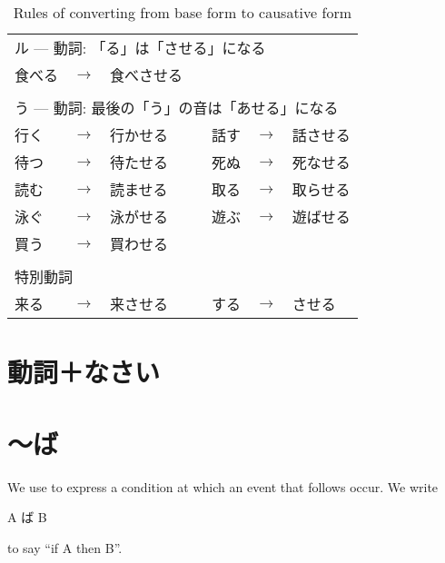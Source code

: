 \documentclass[notoc,notitlepage]{tufte-book}
\begin{document}
\begin{table}[ht]
  \centering
  \caption{Rules of converting from base form to causative form}
  \label{table:rules_of_converting_from_base_form_to_causative_form}
  \begin{tabular}{l c l c l c l}
  \multicolumn{7}{l}{ル --- 動詞: 「る」は「させる」になる} \\
  食べる & $\to$ & 食べさせる &  &  &  &  \\
  $  $ \\
  \multicolumn{7}{l}{う --- 動詞: 最後の「う」の音は「あせる」になる} \\
  行く & $\to$ & 行かせる & & 話す & $\to$ & 話させる \\
  待つ & $\to$ & 待たせる & & 死ぬ & $\to$ & 死なせる \\
  読む & $\to$ & 読ませる & & 取る & $\to$ & 取らせる \\
  泳ぐ & $\to$ & 泳がせる & & 遊ぶ & $\to$ & 遊ばせる \\
  買う & $\to$ & 買わせる \\
  $  $ \\
  \multicolumn{7}{l}{特別動詞} \\
  来る & $\to$ & 来させる & & する & $\to$ & させる
  \end{tabular}
\end{table}


\section{動詞＋なさい}%
\label{sec:doushi_nasai}




\section{〜ば}%
\label{sec:ba}

\begin{defn}[〜ば]\label{defn:_ba}
  We use  to express a condition at which an event that follows
  occur. We write
  \begin{center}
    A ば B
  \end{center}
  to say ``if A then B''.
\end{defn}
\end{document}
